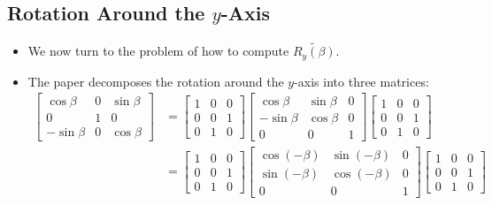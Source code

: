 \documentclass[10pt]{article}
\begin{document}
    \subsection{Rotation Around the $y$-Axis}

    \begin{itemize}
        \item We now turn to the problem of how to compute $\widetilde{R_y(\beta)}$.

        \item The paper decomposes the rotation around the $y$-axis into three matrices:
        \begin{align*}
            \begin{bmatrix}
                \cos\beta & 0 & \sin\beta \\
                0 & 1 & 0 \\
                -\sin\beta & 0 & \cos\beta
            \end{bmatrix}
            &=
            \begin{bmatrix}
                1 & 0 & 0 \\
                0 & 0 & 1 \\
                0 & 1 & 0
            \end{bmatrix}
            \begin{bmatrix}
                \cos\beta & \sin\beta & 0 \\
                -\sin\beta & \cos\beta & 0 \\
                0 & 0 & 1
            \end{bmatrix}
            \begin{bmatrix}
                1 & 0 & 0 \\
                0 & 0 & 1 \\
                0 & 1 & 0
            \end{bmatrix} \\
            &=
            \begin{bmatrix}
                1 & 0 & 0 \\
                0 & 0 & 1 \\
                0 & 1 & 0
            \end{bmatrix}
            \begin{bmatrix}
                \cos(-\beta) & \sin(-\beta) & 0 \\
                \sin(-\beta) & \cos(-\beta) & 0 \\
                0 & 0 & 1
            \end{bmatrix}
            \begin{bmatrix}
                1 & 0 & 0 \\
                0 & 0 & 1 \\
                0 & 1 & 0
            \end{bmatrix}
        \end{align*}


\end{itemize}
\end{document}
